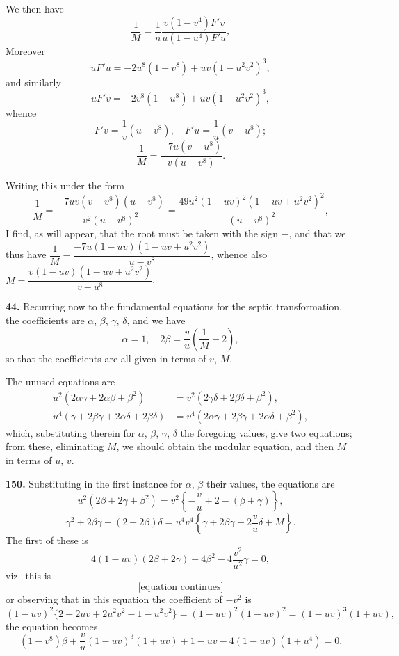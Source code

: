 \documentclass[11pt,a4paper]{article}
\theoremstyle{plain}
\begin{document}
We then have
\[
\frac{1}{M} = \frac{1}{n}\frac{v(1 - v^4)F'v}{u(1 - u^4)F'u},
\]
Moreover
\[
u F'u = -2u^8(1 - v^8) + uv(1 - u^2v^2)^3,
\]
and similarly
\[
u F'v = -2v^8(1 - u^8) + uv(1 - u^2v^2)^3,
\]
whence
\[
F'v = \frac{1}{v}(u - v^8), \quad F'u = \frac{1}{u}(v - u^8);
\]
\[
\frac{1}{M} = \frac{-7u(v - u^8)}{v(u - v^8)}.
\]

Writing this under the form
\[
\frac{1}{M} = \frac{-7uv(v - v^8)(u - v^8)}{v^2(u - v^8)^2} = \frac{49u^2(1 - uv)^2(1 - uv + u^2v^2)^2}{(u - v^8)^2},
\]
I find, as will appear, that the root must be taken with the sign $-$, and that we thus have $\dfrac{1}{M} = \dfrac{-7u(1 - uv)(1 - uv + u^2v^2)}{u - v^8}$, whence also $M = \dfrac{v(1 - uv)(1 - uv + u^2v^2)}{v - u^8}$.

\medskip
\noindent\textbf{44.} Recurring now to the fundamental equations for the septic transformation, the coefficients are $\alpha$, $\beta$, $\gamma$, $\delta$, and we have
\[
\alpha = 1, \quad 2\beta = \frac{v}{u}\left(\frac{1}{M} - 2\right),
\]
so that the coefficients are all given in terms of $v$, $M$.

The unused equations are
\begin{align*}
u^2(2\alpha\gamma + 2\alpha\beta + \beta^2) &= v^2(2\gamma\delta + 2\beta\delta + \beta^2), \\
u^4(\gamma + 2\beta\gamma + 2\alpha\delta + 2\beta\delta) &= v^4(2\alpha\gamma + 2\beta\gamma + 2\alpha\delta + \beta^2),
\end{align*}
which, substituting therein for $\alpha$, $\beta$, $\gamma$, $\delta$ the foregoing values, give two equations; from these, eliminating $M$, we should obtain the modular equation, and then $M$ in terms of $u$, $v$.


\noindent\textbf{150.} Substituting in the first instance for $\alpha$, $\beta$ their values, the equations are
\[
u^2(2\beta + 2\gamma + \beta^2) = v^2\left\{-\frac{v}{u} + 2 - (\beta + \gamma)\right\},
\]
\[
\gamma^2 + 2\beta\gamma + (2 + 2\beta)\delta = u^4v^4\left\{\gamma + 2\beta\gamma + 2\frac{v}{u}\delta + M\right\}.
\]
The first of these is
\[
4(1 - uv)(2\beta + 2\gamma) + 4\beta^2 - 4\frac{v^2}{u^2}\gamma = 0,
\]
viz.\ this is
\[
\text{[equation continues]}
\]
or observing that in this equation the coefficient of $-v^2$ is
\[
(1 - uv)^2\{2 - 2uv + 2u^2v^2 - 1 - u^2v^2\} = (1 - uv)^2(1 - uv)^2 = (1 - uv)^3(1 + uv),
\]
the equation becomes
\[
(1 - v^8)\beta + \frac{v}{u}(1 - uv)^3(1 + uv) + 1 - uv - 4(1 - uv)(1 + u^4) = 0.
\]
\end{document}
